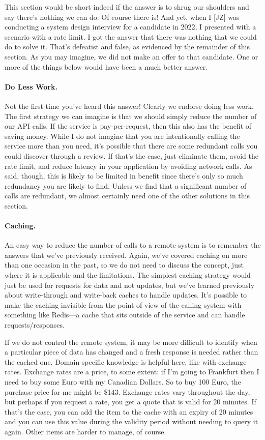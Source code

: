 This section would be short indeed if the answer is to shrug our shoulders and say there's nothing we can do. Of course there is! And yet, when I [JZ] was conducting a system design interview for a candidate in 2022, I presented with a scenario with a rate limit. I got the answer that there was nothing that we could do to solve it. That's defeatist and false, as evidenced by the remainder of this section. As you may imagine, we did not make an offer to that candidate. One or more of the things below would have been a much better answer.



\paragraph{Do Less Work.}
Not the first time you've heard this answer! Clearly we endorse doing less work. The first strategy we can imagine is that we should simply reduce the number of our API calls. If the service is pay-per-request, then this also has the benefit of saving money. While I do not imagine that you are intentionally calling the service more than you need, it's possible that there are some redundant calls you could discover through a review. If that's the case, just eliminate them, avoid the rate limit, and reduce latency in your application by avoiding network calls. As said, though, this is likely to be limited in benefit since there's only so much redundancy you are likely to find. Unless we find that a significant number of calls are redundant, we almost certainly need one of the other solutions in this section. 

\paragraph{Caching.}
An easy way to reduce the number of calls to a remote system is to remember the answers that we've previously received. Again, we've covered caching on more than one occasion in the past, so we do not need to discuss the concept, just where it is applicable and the limitations. The simplest caching strategy would just be used for requests for data and not updates, but we've learned previously about write-through and write-back caches to handle updates. It's possible to make the caching invisible from the point of view of the calling system with something like Redis---a cache that sits outside of the service and can handle requests/responses. 

If we do not control the remote system, it may be more difficult to identify when a particular piece of data has changed and a fresh response is needed rather than the cached one. Domain-specific knowledge is helpful here, like with exchange rates. Exchange rates are a price, to some extent: if I'm going to Frankfurt then I need to buy some Euro with my Canadian Dollars. So to buy 100 Euro, the purchase price for me might be \$143. Exchange rates vary throughout the day, but perhaps if you request a rate, you get a quote that is valid for 20 minutes. If that's the case, you can add the item to the cache with an expiry of 20 minutes and you can use this value during the validity period without needing to query it again. Other items are harder to manage, of course.


